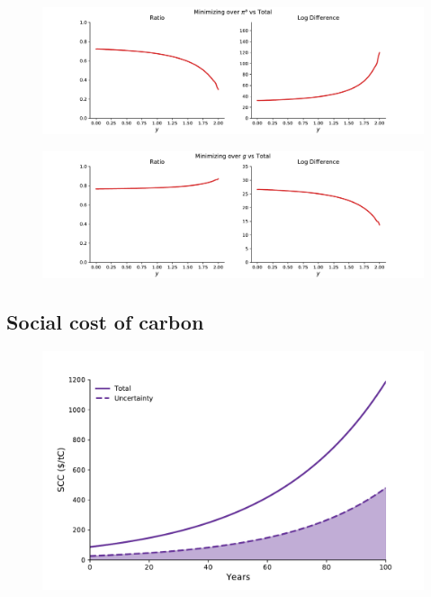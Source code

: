 \documentclass[11pt]{article}
\begin{document}
\begin{figure}[H]
		\center
		\includegraphics[height=.25\textheight]{me_min_a.pdf}
\end{figure}

\begin{figure}[H]
		\center
		\includegraphics[height=.25\textheight]{me_min_p.pdf}
\end{figure}

\subsection{Social cost of carbon}
\begin{figure}[H]
		\center
		\includegraphics[height=.35\textheight]{scc.pdf}
\end{figure}
\end{document}
